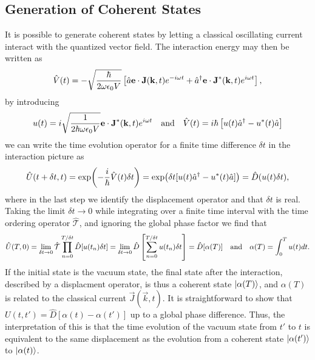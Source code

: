 \subsection{Generation of Coherent States}
It is possible to generate coherent states by letting a classical oscillating current interact with the quantized vector field. The interaction energy may then be written as 
\begin{equation}
    \hat{V}(t) = - \sqrt{\frac{\hbar}{2\omega\epsilon_0 V}} \left[ \a \vec{e} \cdot \vec{J}(\vec{k},t) e^{-i\omega t} + \ad \vec{e} \cdot \vec{J}^*(\vec{k}, t)e^{i\omega t} \right],
\end{equation}
by introducing 
\begin{equation}
    u(t) = i \sqrt{\frac{1}{2\hbar\omega\epsilon_0V}} \vec{e} \cdot \vec{J}^*(\vec{k},t)e^{i\omega t}  \textand \hat{V}(t) = i\hbar \left[u(t)\ad - u^*(t)\a \right]
\end{equation}
we can write the time evolution operator for a finite time difference $\delta t$ in the interaction picture as
\begin{equation}
    \hat{U}(t + \delta t, t) = \exp(- \frac{i}{\hbar}\hat{V}(t)\delta t) = \exp(\delta t [u(t)\hat{a}^\dagger - u^*(t)\hat{a}]) = \hat{D}(u(t)\delta t),
\end{equation}
where in the last step we identify the displacement operator and that $\delta t$ is real. Taking the limit $\delta t \to 0$ while integrating over a finite time interval with the time ordering operator $\hat{\mathcal{T}}$, and ignoring the global phase factor we find that
\begin{equation}
    \hat{U}(T,0) = \lim_{\delta t \to 0} \mathcal{\hat{T}} \prod_{n=0}^{T/\delta t} \hat{D}[u(t_n) \delta t] = \lim_{\delta t \to 0} \hat{D}\left[ \sum_{n=0}^{T/\delta t} u(t_n) \delta t \right]  = \hat{D}[\alpha(T)] \quad\text{and}\quad \alpha(T) = \int_0^T u(t) dt.
\end{equation}
If the initial state is the vacuum state, the final state after the interaction, described by a displacment operator, is thus a coherent state $\ket{\alpha(T)}$, and $\alpha(T)$ is related to the classical current $\vec{J}(\vec{k},t)$. It is straightforward to show that $U(t,t') = \hat{D}[\alpha(t) - \alpha(t')]$ up to a global phase difference. Thus, the interpretation of this is that the time evolution of the vacuum state from $t'$ to $t$ is equivalent to the same displacement as the evolution from a coherent state $\ket{\alpha(t')}$ to $\ket{\alpha(t)}$.

